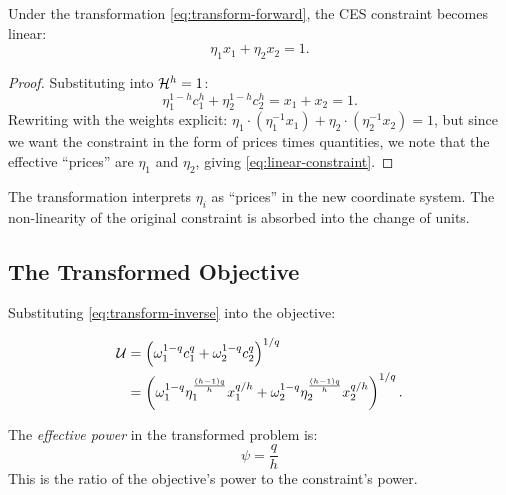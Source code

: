 \begin{proposition}
\label{prop:linear-constraint}
Under the transformation \eqref{eq:transform-forward}, the CES constraint becomes linear:
\begin{equation}
\label{eq:linear-constraint}
\eta_1 x_1 + \eta_2 x_2 = 1.
\end{equation}
\end{proposition}

\begin{proof}
Substituting into $\mathcal{H}^h = 1$:
\[
\eta_1^{1-h} c_1^{h} + \eta_2^{1-h} c_2^{h} = x_1 + x_2 = 1.
\]
Rewriting with the weights explicit: $\eta_1 \cdot (\eta_1^{-1} x_1) + \eta_2 \cdot (\eta_2^{-1} x_2) = 1$, but since we want the constraint in the form of prices times quantities, we note that the effective ``prices'' are $\eta_1$ and $\eta_2$, giving \eqref{eq:linear-constraint}.
\end{proof}

\begin{remark}
The transformation interprets $\eta_i$ as ``prices'' in the new coordinate system. The non-linearity of the original constraint is absorbed into the change of units.
\end{remark}

\subsection{The Transformed Objective}
\label{subsec:transformed-objective}

Substituting \eqref{eq:transform-inverse} into the objective:

\begin{align}
\mathcal{U} &= \left( \omega_1^{1-q} c_1^{q} + \omega_2^{1-q} c_2^{q} \right)^{1/q} \notag \\
&= \left( \omega_1^{1-q} \eta_1^{\frac{(h-1)q}{h}} x_1^{q/h} + \omega_2^{1-q} \eta_2^{\frac{(h-1)q}{h}} x_2^{q/h} \right)^{1/q}.
\label{eq:transformed-objective-raw}
\end{align}

\begin{definition}
\label{def:effective-power}
The \emph{effective power} in the transformed problem is:
\begin{equation}
\label{eq:psi-def}
\boxed{\psi = \frac{q}{h}}
\end{equation}
This is the ratio of the objective's power to the constraint's power.
\end{definition}


